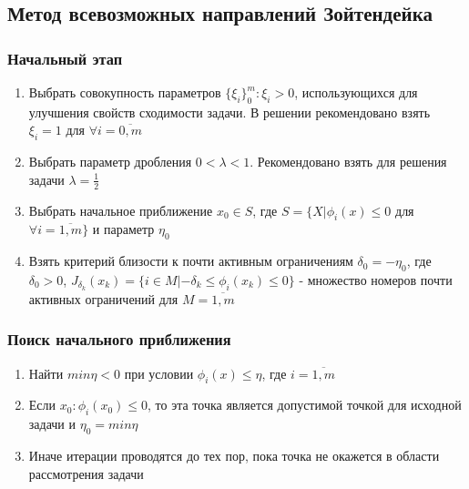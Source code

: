 \documentclass[../body.tex]{subfiles}
\begin{document}
\subsection{Метод всевозможных направлений Зойтендейка}
\subsubsection{Начальный этап}
\begin{enumerate}
    \item Выбрать совокупность параметров $\{\xi_i\}_0^m:\xi_i>0$, использующихся для улучшения свойств сходимости задачи. В решении рекомендовано взять $\xi_i=1$ для $\forall i=\overline{0,m}$
    \item Выбрать параметр дробления $0<\lambda<1$. Рекомендовано взять для решения задачи $\lambda=\frac{1}{2}$
    \item Выбрать начальное приближение $x_0\in S$, где $S=\{X|\phi_i(x)\leq0$ для $\forall i=\overline{1,m}\}$ и параметр $\eta_0$
    \item Взять критерий близости к почти активным ограничениям $\delta_0=-\eta_0$, где $\delta_0>0$, $J_{\delta_k}(x_k)=\{i\in M|-\delta_k\leq\phi_i(x_k)\leq0\}$ - множество номеров почти активных ограничений для $M=\overline{1,m}$
\end{enumerate}

\subsubsection{Поиск начального приближения}
\begin{enumerate}
    \item Найти $min\eta<0$ при условии $\phi_i(x)\leq\eta$, где $i=\overline{1,m}$
    \item Если $x_0:\phi_i(x_0)\leq0$, то эта точка является допустимой точкой для исходной задачи и $\eta_0=min\eta$
    \item Иначе итерации проводятся до тех пор, пока точка не окажется в области рассмотрения задачи
\end{enumerate}
\end{document}
